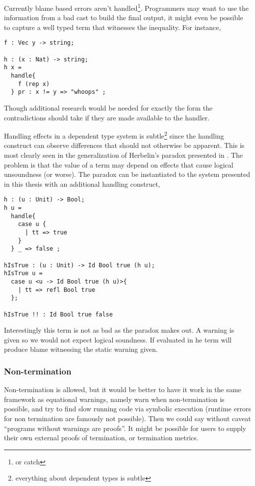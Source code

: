 Currently blame based errors aren't handled\footnote{or catch}.
Programmers may want to use the information from a bad cast to build the final output, it might even be possible to capture a well typed term that witnesses the inequality.
For instance,

\begin{lstlisting}
f : Vec y -> string;

h : (x : Nat) -> string;
h x =
  handle{
    f (rep x)
  } pr : x != y => "whoops" ;
\end{lstlisting}

Though additional research would be needed for exactly the form the contradictions should take if they are made available to the handler.

Handling effects in a dependent type system is subtle\footnote{everything about dependent types is subtle} since the handling construct can observe differences that should not otherwise be apparent.
This is most clearly seen in the generalization of Herbelin's paradox presented in \cite{pedrot2020fire}.
The problem is that the value of a \Bool{} term may depend on effects that cause logical unsoundness (or worse).
The paradox can be instantiated to the system presented in this thesis with an additional handling construct,

\begin{lstlisting}
h : (u : Unit) -> Bool;
h u =
  handle{
    case u {
      | tt => true
    }
  } _ => false ;

hIsTrue : (u : Unit) -> Id Bool true (h u);
hIsTrue u =
  case u <u -> Id Bool true (h u)>{
    | tt => refl Bool true
  };

hIsTrue !! : Id Bool true false
\end{lstlisting}

Interestingly this term is not as bad as the paradox makes out.
A warning is given so we would not expect logical soundness.
If evaluated in \whnf{} he term will produce blame witnessing the static warning given.


\subsubsection{Non-termination}

Non-termination is allowed, but it would be better to have it work in the same framework as equational warnings, namely warn when non-termination is possible, and try to find slow running code via symbolic execution (runtime errors for non termination are famously not possible).
Then we could say without caveat ``programs without warnings are proofs''.
It might be possible for users to supply their own external proofs of termination\cite{casinghino2014combining}, or termination metrics.

